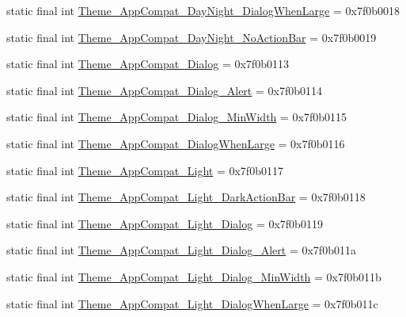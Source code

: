 \begin{CompactItemize}
\item 
static final int \hyperlink{classandroid_1_1support_1_1v7_1_1appcompat_1_1_r_1_1style_bdb514e4309025ba44462ec18cf13cb6}{Theme\_\-AppCompat\_\-DayNight\_\-DialogWhenLarge} = 0x7f0b0018
\item 
static final int \hyperlink{classandroid_1_1support_1_1v7_1_1appcompat_1_1_r_1_1style_77f719e479d59c611db2e93d38fab11b}{Theme\_\-AppCompat\_\-DayNight\_\-NoActionBar} = 0x7f0b0019
\item 
static final int \hyperlink{classandroid_1_1support_1_1v7_1_1appcompat_1_1_r_1_1style_de02eab1805e5e6e7d257779c60b1b72}{Theme\_\-AppCompat\_\-Dialog} = 0x7f0b0113
\item 
static final int \hyperlink{classandroid_1_1support_1_1v7_1_1appcompat_1_1_r_1_1style_c9b36052c4022987e1676d1271a23776}{Theme\_\-AppCompat\_\-Dialog\_\-Alert} = 0x7f0b0114
\item 
static final int \hyperlink{classandroid_1_1support_1_1v7_1_1appcompat_1_1_r_1_1style_8355ae3bc7d8aca920f50a4eb5900cb4}{Theme\_\-AppCompat\_\-Dialog\_\-MinWidth} = 0x7f0b0115
\item 
static final int \hyperlink{classandroid_1_1support_1_1v7_1_1appcompat_1_1_r_1_1style_0c0e91c3cc8668ccae87b26fd05c04c9}{Theme\_\-AppCompat\_\-DialogWhenLarge} = 0x7f0b0116
\item 
static final int \hyperlink{classandroid_1_1support_1_1v7_1_1appcompat_1_1_r_1_1style_f171fe4098e62101e12431491db9aa09}{Theme\_\-AppCompat\_\-Light} = 0x7f0b0117
\item 
static final int \hyperlink{classandroid_1_1support_1_1v7_1_1appcompat_1_1_r_1_1style_e184be988b6c92da32905edcc646e3d3}{Theme\_\-AppCompat\_\-Light\_\-DarkActionBar} = 0x7f0b0118
\item 
static final int \hyperlink{classandroid_1_1support_1_1v7_1_1appcompat_1_1_r_1_1style_efec7ba9313b041bec76e7b7738b26b6}{Theme\_\-AppCompat\_\-Light\_\-Dialog} = 0x7f0b0119
\item 
static final int \hyperlink{classandroid_1_1support_1_1v7_1_1appcompat_1_1_r_1_1style_9fcb901c4e9169954c8f89a49ac25922}{Theme\_\-AppCompat\_\-Light\_\-Dialog\_\-Alert} = 0x7f0b011a
\item 
static final int \hyperlink{classandroid_1_1support_1_1v7_1_1appcompat_1_1_r_1_1style_f1f81147ef8a134e8523c6700aed4c3b}{Theme\_\-AppCompat\_\-Light\_\-Dialog\_\-MinWidth} = 0x7f0b011b
\item 
static final int \hyperlink{classandroid_1_1support_1_1v7_1_1appcompat_1_1_r_1_1style_102b3bfc2316faf6c5d4d2b3329dff2f}{Theme\_\-AppCompat\_\-Light\_\-DialogWhenLarge} = 0x7f0b011c

\end{CompactItemize}
